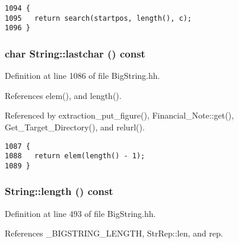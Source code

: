 \footnotesize\begin{verbatim}1094 {
1095   return search(startpos, length(), c);
1096 }
\end{verbatim}\normalsize 
{}
\subsubsection{\setlength{\rightskip}{0pt plus 5cm}char String::lastchar () const\hspace{0.3cm}{\tt  [inline]}}\label{classString_a102}




Definition at line 1086 of file Big\-String.hh.

References elem(), and length().

Referenced by extraction\_\-put\_\-figure(), Financial\_\-Note::get(), Get\_\-Target\_\-Directory(), and relurl().



\footnotesize\begin{verbatim}1087 { 
1088   return elem(length() - 1);
1089 }
\end{verbatim}\normalsize 
{}
\subsubsection{ String::length () const\hspace{0.3cm}{\tt  [inline]}}\label{classString_a105}




Definition at line 493 of file Big\-String.hh.

References \_\-BIGSTRING\_\-LENGTH, Str\-Rep::len, and rep.

